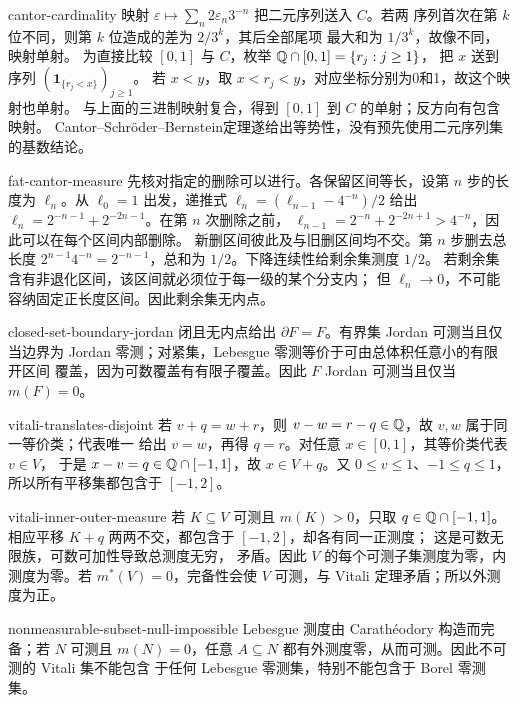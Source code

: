 \begin{solution}{cantor-cardinality}
映射
$\varepsilon\mapsto\sum_n2\varepsilon_n3^{-n}$ 把二元序列送入 $C$。若两
序列首次在第 $k$ 位不同，则第 $k$ 位造成的差为 $2/3^k$，其后全部尾项
最大和为 $1/3^k$，故像不同，映射单射。
为直接比较 $[0,1]$ 与 $C$，枚举 $\mathbb{Q}\cap[0,1]=\{r_j:j\ge1\}$，
把 $x$ 送到序列 $(\mathbf1_{\{r_j<x\}})_{j\ge1}$。
若 $x<y$，取 $x<r_j<y$，对应坐标分别为0和1，故这个映射也单射。
与上面的三进制映射复合，得到 $[0,1]$ 到 $C$ 的单射；反方向有包含映射。
Cantor--Schröder--Bernstein定理遂给出等势性，没有预先使用二元序列集的基数结论。
\end{solution}

\begin{solution}{fat-cantor-measure}
先核对指定的删除可以进行。各保留区间等长，设第 $n$ 步的长度为
$\ell_n$。从 $\ell_0=1$ 出发，递推式
$\ell_n=(\ell_{n-1}-4^{-n})/2$ 给出
$\ell_n=2^{-n-1}+2^{-2n-1}$。在第 $n$ 次删除之前，
$\ell_{n-1}=2^{-n}+2^{-2n+1}>4^{-n}$，因此可以在每个区间内部删除。
新删区间彼此及与旧删区间均不交。第 $n$ 步删去总长度
$2^{n-1}4^{-n}=2^{-n-1}$，总和为 $1/2$。下降连续性给剩余集测度 $1/2$。
若剩余集含有非退化区间，该区间就必须位于每一级的某个分支内；
但 $\ell_n\to0$，不可能容纳固定正长度区间。因此剩余集无内点。
\end{solution}

\begin{solution}{closed-set-boundary-jordan}
闭且无内点给出 $\partial F=F$。有界集 Jordan 可测当且仅当边界为
Jordan 零测；对紧集，Lebesgue 零测等价于可由总体积任意小的有限开区间
覆盖，因为可数覆盖有有限子覆盖。因此 $F$ Jordan 可测当且仅当
$m(F)=0$。
\end{solution}

\begin{solution}{vitali-translates-disjoint}
若 $v+q=w+r$，则 $v-w=r-q\in\mathbb{Q}$，故 $v,w$ 属于同一等价类；代表唯一
给出 $v=w$，再得 $q=r$。对任意 $x\in[0,1]$，其等价类代表 $v\in V$，
于是 $x-v=q\in\mathbb{Q}\cap[-1,1]$，故 $x\in V+q$。又
$0\le v\le1$、$-1\le q\le1$，所以所有平移集都包含于 $[-1,2]$。
\end{solution}

\begin{solution}{vitali-inner-outer-measure}
若 $K\subseteq V$ 可测且 $m(K)>0$，只取 $q\in\mathbb{Q}\cap[-1,1]$。
相应平移 $K+q$ 两两不交，都包含于 $[-1,2]$，却各有同一正测度；
这是可数无限族，可数可加性导致总测度无穷，
矛盾。因此 $V$ 的每个可测子集测度为零，内测度为零。若
$m^*(V)=0$，完备性会使 $V$ 可测，与 Vitali 定理矛盾；所以外测度为正。
\end{solution}

\begin{solution}{nonmeasurable-subset-null-impossible}
Lebesgue 测度由 Carathéodory 构造而完备；若 $N$ 可测且 $m(N)=0$，任意
$A\subseteq N$ 都有外测度零，从而可测。因此不可测的 Vitali 集不能包含
于任何 Lebesgue 零测集，特别不能包含于 Borel 零测集。
\end{solution}
